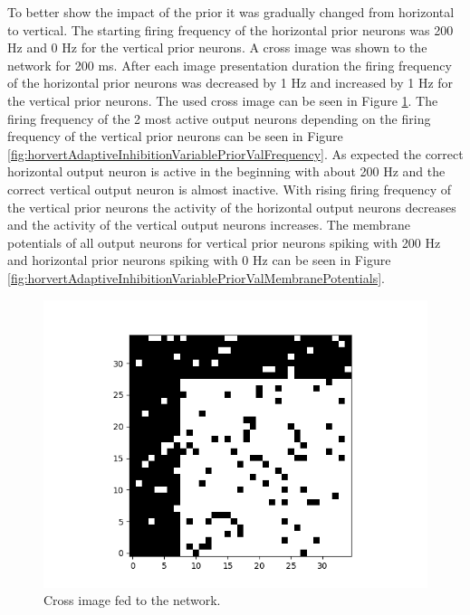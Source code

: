 To better show the impact of the prior it was gradually changed from horizontal to vertical. The starting firing frequency of the horizontal prior neurons was 200 Hz and 0 Hz for the vertical prior neurons. A cross image was shown to the network for 200 ms. After each image presentation duration the firing frequency of the horizontal prior neurons was decreased by 1 Hz and increased by 1 Hz for the vertical prior neurons. The used cross image can be seen in Figure \ref{fig:horvertAdaptiveInhibitionVariablePriorValImage}. The firing frequency of the 2 most active output neurons depending on the firing frequency of the vertical prior neurons can be seen in Figure \ref{fig:horvertAdaptiveInhibitionVariablePriorValFrequency}. As expected the correct horizontal output neuron is active in the beginning with about 200 Hz and the correct vertical output neuron is almost inactive. With rising firing frequency of the vertical prior neurons the activity of the horizontal output neurons decreases and the activity of the vertical output neurons increases. The membrane potentials of all output neurons for vertical prior neurons spiking with 200 Hz and horizontal prior neurons spiking with 0 Hz can be seen in Figure \ref{fig:horvertAdaptiveInhibitionVariablePriorValMembranePotentials}.

\begin{figure}
  \includegraphics[width=\linewidth]{figures/horvertAdaptiveInh/crossImageForVariablePrior.png}
  \caption{ Cross image fed to the network. }
  \label{fig:horvertAdaptiveInhibitionVariablePriorValImage}
\end{figure}


